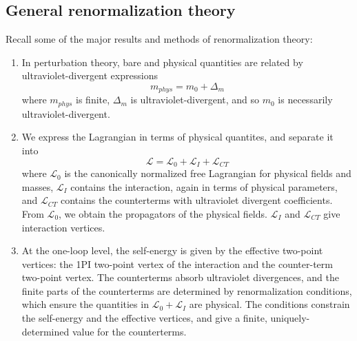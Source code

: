 \documentclass[cyan]{elegantnote}
\begin{document}
\subsection{General renormalization theory}
Recall some of the major results and methods of renormalization theory:
\begin{enumerate}
\item In perturbation theory, bare and physical quantities are related by ultraviolet-divergent expressions
\[m_{phys} = m_0 + \Delta_m\]
where $m_{phys}$ is finite, $\Delta_m$ is ultraviolet-divergent, and so $m_0$ is necessarily ultraviolet-divergent.
\item We express the Lagrangian in terms of physical quantites, and separate it into
\[\mathcal{L} = \mathcal{L}_0 + \mathcal{L}_I + \mathcal{L}_{CT}\]
where $\mathcal{L}_0$ is the canonically normalized free Lagrangian for physical fields and masses, $\mathcal{L}_I$ contains the interaction, again in terms of physical parameters, and $\mathcal{L}_{CT}$ contains the counterterms with ultraviolet divergent coefficients. From $\mathcal{L}_0$, we obtain the propagators of the physical fields. $\mathcal{L}_I$ and $\mathcal{L}_{CT}$ give
interaction vertices.
\item At the one-loop level, the self-energy is given by the effective two-point vertices: the 1PI two-point vertex of the interaction and the counter-term two-point vertex. The counterterms absorb ultraviolet divergences, and the finite parts of the counterterms are determined by renormalization conditions,
which ensure the quantities in $\mathcal{L}_0 + \mathcal{L}_I$ are physical. The conditions constrain the self-energy and the effective vertices, and give a finite, uniquely-determined value for the counterterms.
\end{enumerate}
\end{document}
